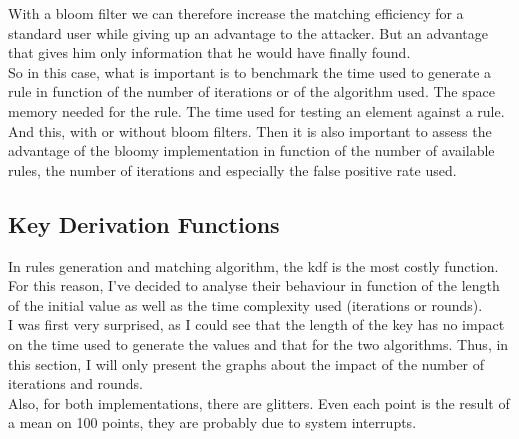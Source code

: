 \documentclass{eplmastersthesis}
\begin{document}
With a bloom filter we can therefore increase the matching efficiency for a standard user while giving up an advantage to the attacker. But an advantage that gives him only information that he would have finally found.\\

So in this case, what is important is to benchmark the time used to generate a rule in function of the number of iterations or of the algorithm used. The space memory needed for the rule. The time used for testing an element against a rule.\\
And this, with or without bloom filters. Then it is also important to assess the advantage of the bloomy implementation in function of the number of available rules, the number of iterations and especially the false positive rate used.

\subsection{Key Derivation Functions}
\label{sec:KeyDerivationFunction}
In rules generation and matching algorithm, the \gls{kdf} is the most costly function. For this reason, I've decided to analyse their behaviour in function of the length of the initial value as well as the time complexity used (iterations or rounds).\\

I was first very surprised, as I could see that the length of the key has no impact on the time used to generate the values and that for the two algorithms. Thus, in this section, I will only present the graphs about the impact of the number of iterations and rounds.\\

Also, for both implementations, there are glitters. Even each point is the result of a mean on 100 points, they are probably due to system interrupts.\\
\end{document}
